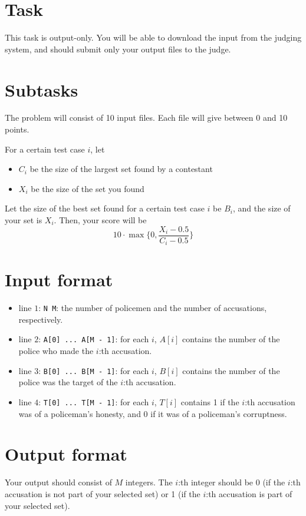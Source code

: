 \section*{Task}
This task is output-only. You will be able to download the input from the judging system, and should submit only your output files
to the judge.

\section*{Subtasks}
The problem will consist of 10 input files. Each file will give between 0 and 10 points.

For a certain test case $i$, let
\begin{itemize}
  \item $C_i$ be the size of the largest set found by a contestant
  \item $X_i$ be the size of the set you found
\end{itemize}
Let the size of the best set found for a certain test case $i$ be $B_i$, and the size of your set is $X_i$. Then, your score will be
\[ 10 \cdot \max\{ 0, \frac{X_i - 0.5}{C_i - 0.5} \} \]

\section*{Input format}
\begin{itemize}
  \item line $1$: \texttt{N M}: the number of policemen and the number of accusations, respectively.
  \item line $2$: \texttt{A[0] ... A[M - 1]}: for each $i$, $A[i]$ contains the number of the police who made the $i$:th accusation.
  \item line $3$: \texttt{B[0] ... B[M - 1]}: for each $i$, $B[i]$ contains the number of the police was the target of the $i$:th accusation.
  \item line $4$: \texttt{T[0] ... T[M - 1]}: for each $i$, $T[i]$ contains 1 if the $i$:th accusation was of a policeman's honesty, and 0 if it was of a policeman's corruptness.
\end{itemize}

\section*{Output format}
Your output should consist of $M$ integers. The $i$:th integer should be 0 (if the $i$:th accusation is not part of your selected set) or 1 (if the $i$:th accusation is part of your selected set).
